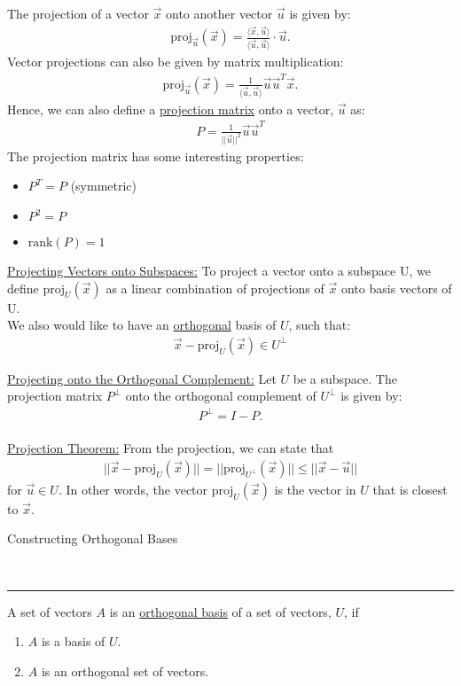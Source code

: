 \documentclass{article}
\newcommand{\header}[1]{\begin{large}\noindent #1\end{large}\\\rule{\textwidth}{0.5pt}}
\newcommand{\gap}{\medskip\\}
\newcommand{\sheader}[1]{\underline{#1:}}
\newcommand{\proj}[2]{{}\textrm{proj}_{#1}\left(#2\right)}
\begin{document}
The projection of a vector $\vec{x}$ onto another vector $\vec{u}$ 
is given by:
\begin{align*}
    \textrm{proj}_{\vec{u}}(\vec{x}) = \frac{\langle \vec{x}, \vec{u}\rangle}{\langle \vec{u}, \vec{u}\rangle} \cdot \vec{u}.
\end{align*}
Vector projections can also be given by matrix multiplication:
\begin{align*}
    \textrm{proj}_{\vec{u}}(\vec{x}) = \frac{1}{\langle \vec{u}, \vec{u}\rangle} \vec{u}\vec{u}^T \vec{x}.
\end{align*}
Hence, we can also define a \underline{projection matrix} onto a 
vector, $\vec{u}$ as:
\begin{align*}
    P = \frac{1}{||\vec{u}||^2} \vec{u}\vec{u}^T
\end{align*}
The projection matrix has some interesting properties:
\begin{itemize}
    \item $P^T = P$ (symmetric)
    \item $P^2 = P$
    \item $\textrm{rank}(P) = 1$
\end{itemize}
\sheader{Projecting Vectors onto Subspaces} To project a vector onto
a subspace U, we define $\textrm{proj}_U(\vec{x})$ as a linear 
combination of projections of $\vec{x}$ onto basis vectors of U.
\gap
We also would like to have an \underline{orthogonal} basis of $U$,
such that:
\begin{align*}
    \vec{x} - \textrm{proj}_U(\vec{x}) \in U^\perp
\end{align*}

\sheader{Projecting onto the Orthogonal Complement}
Let $U$ be a subspace. The projection matrix $P^\perp$ onto the 
orthogonal complement of $U^\perp$ is given by:
\begin{align*}
    P^\perp = I - P.
\end{align*}
\gap
\sheader{Projection Theorem} From the projection, we can state that
\begin{align*}
    ||\vec{x} - \proj{U}{\vec{x}} || = ||\proj{U^\perp}{\vec{x}}||  \leq ||\vec{x} - \vec{u}||
\end{align*}
for $\vec{u} \in U$. In other words, the vector $\proj{U}{\vec{x}}$
is the vector in $U$ that is closest to $\vec{x}$.
\gap
\header{Constructing Orthogonal Bases}
A set of vectors $A$ is an \underline{orthogonal basis} of a set of vectors,
$U$, if 
\begin{enumerate}
    \item $A$ is a basis of $U$.
    \item $A$ is an orthogonal set of vectors.
\end{enumerate}
\end{document}
